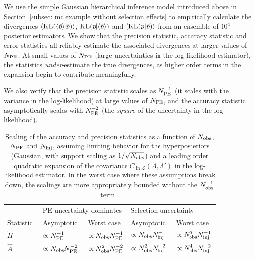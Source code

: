 We use the simple Gaussian hierarchical inference model introduced above in Section~\ref{subsec: mc example without selection effects} to empirically calculate the \KL divergences $\langle{\rm KL}(\langle\hat{p}\rangle|\hat{p})\rangle$, ${\rm KL}(p|\langle\hat{p}\rangle)$ and $\langle{\rm KL}(p|\hat{p})\rangle$ from an ensemble of $10^4$ posterior estimators. 
We show that the precision statistic, accuracy statistic and error statistics all reliably estimate the associated \KL divergences at larger values of $N_{\rm PE}$. 
At small values of $N_{\rm PE}$ (large uncertainties in the log-likelihood estimator), the statistics \textit{under}-estimate the true \KL divergences, as higher order terms in the expansion begin to contribute meaningfully. 

We also verify that the precision statistic scales as $N_{\rm PE}^{-1}$ (it scales with the variance in the log-likelihood) at large values of $N_{\rm PE}$, and the accuracy statistic asymptotically scales with $N_{\rm PE}^{-2}$ (the \textit{square} of the uncertainty in the log-likelihood).

\begin{table}[h]
\normalsize
\renewcommand{\arraystretch}{1.5}
\centering
\begin{tabular}{lllll}
\hline\hline
& \multicolumn{2}{l}{PE uncertainty dominates} & \multicolumn{2}{l}{Selection uncertainty} dominates \\ 
Statistic \quad\, & Asymptotic \quad\, & Worst case \quad\, & Asymptotic \quad\, & Worst case \quad\, \\ \hline 
$\hat{\Pi}$ & \(\displaystyle \propto N_{\rm PE}^{-1}\) & \(\displaystyle \propto N_{\rm obs}N_{\rm PE}^{-1}\) & \(\displaystyle \propto N_{\rm obs}N_{\rm inj}^{-1}\) & \(\displaystyle \propto N_{\rm obs}^2N_{\rm inj}^{-1}\) \\ 
$\hat{A}$ & \(\displaystyle \propto N_{\rm obs}N_{\rm PE}^{-2}\) & \(\displaystyle \propto N_{\rm obs}^2N_{\rm PE}^{-2}\) & \(\displaystyle \propto N_{\rm obs}^3N_{\rm inj}^{-2}\) & \(\displaystyle \propto N_{\rm obs}^4N_{\rm inj}^{-2}\) \\
\hline\hline
\end{tabular}
\caption{Scaling of the accuracy and precision statistics as a function of $N_{\rm obs}$, $N_{\rm PE}$ and $N_{\rm inj}$, assuming limiting behavior for the hyperposteriors (Gaussian, with support scaling as $1 / \sqrt{N_{\rm obs}}$) and a leading order quadratic expansion of the covariance $C_{\ln \mathcal{L}}(\Lambda, \Lambda')$ in the log-likelihood estimator. In the worst case where these assumptions break down, the scalings are more appropriately bounded without the $N_{\rm obs}^{-1}$ term \citep{Essick:2022ojx, Talbot:2023pex}.
} 
\label{tab: scaling}
\end{table}

